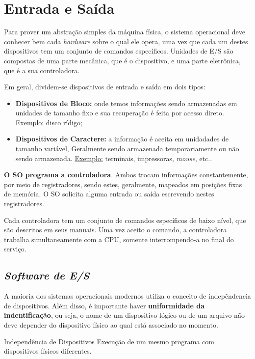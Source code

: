 \chapter{Entrada e Saída}

Para prover um abstração simples da máquina física, o sistema operacional deve conhecer bem cada \textit{hardware} sobre o qual ele opera, uma vez que cada um destes dispositivos tem um conjunto de comandos específicos. Unidades de E/S são compostas de uma parte mecânica, que é o dispositivo, e uma parte eletrônica, que é a sua controladora.

Em geral, dividem-se dispositivos de entrada e saída em dois tipos:
\begin{itemize}
  \item \textbf{Dispositivos de Bloco:} onde temos informações sendo armazenadas em unidades de tamanho fixo e sua recuperação é feita por acesso direto. \underline{Exemplo:} disco rídigo;

  \item \textbf{Dispositivos de Caractere:} a informação é aceita em unidadades de tamanho variável, Geralmente sendo armazenada temporariamente ou não sendo armazenada. \underline{Exemplo:} terminais, impressoras, \textit{mouse}, etc..
\end{itemize}

\textbf{O SO programa a controladora}. Ambos trocam informações constantemente, por meio de registradores, sendo estes, geralmente, mapeados em posições fixas de memória. O SO solicita alguma entrada ou saída escrevendo nestes registradores.

Cada controladora tem um conjunto de comandos específicos de baixo nível, que são descritos em seus manuais. Uma vez aceito o comando, a controladora trabalha simultaneamente com a CPU, somente interrompendo-a no final do serviço.







\section{\textit{Software de E/S}}
A maioria dos sistemas operacionais modernos utiliza o conceito de indepêndencia de dispositivos. Além disso, é importante haver \textbf{uniformidade da indentificação}, ou seja, o nome de um dispositivo lógico ou de um arquivo não deve depender do dispositivo físico ao qual está associado no momento.

\begin{definicao}{Independência de Dispositivos}
  Execução de um mesmo programa com dispositivos físicos diferentes.
\end{definicao}

